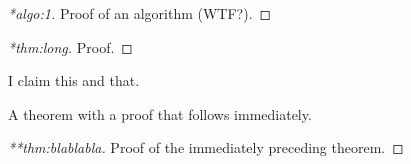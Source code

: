 \documentclass[12pt]{article}
\begin{document}
\begin{proof}[*algo:1]
  Proof of an algorithm (WTF?).
\end{proof}

\begin{proof}[*thm:long]
  Proof.
\end{proof}

\begin{claim}
  I claim this and that.
\end{claim}

\cleardoublepage

\begin{theorem}
  \label{thm:blablabla}
  A theorem with a proof that follows immediately.
\end{theorem}
\begin{proof}[**thm:blablabla]
  Proof of the immediately preceding theorem.
\end{proof}
\end{document}
